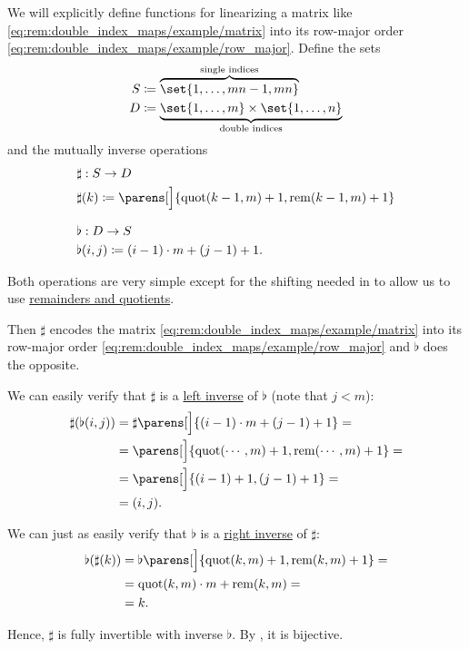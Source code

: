 \begin{remark}
  We will explicitly define functions for linearizing a matrix like \eqref{eq:rem:double_index_maps/example/matrix} into its row-major order \eqref{eq:rem:double_index_maps/example/row_major}. Define the sets
  \begin{align*}
    S &\coloneqq \overbrace{ \set{ 1, \ldots, mn - 1, mn } }^{\T{single indices}}
    \\
    D &\coloneqq \underbrace{ \set{ 1, \ldots, m } \times \set{ 1, \ldots, n } }_{\T{double indices}}
  \end{align*}
  and the mutually inverse operations
  \begin{align}
    &\begin{aligned}\label{eq:rem:double_index_maps/sharp}
      &\sharp: S \to D \\
      &\sharp(k) \coloneqq \parens[\Big]{ \quot(k - 1, m) + 1, \rem(k - 1, m) + 1 } \\
    \end{aligned}
    \\[0.5\baselineskip]
    &\begin{aligned}\label{eq:rem:double_index_maps/flat}
      &\flat: D \to S \\
      &\flat(i, j) \coloneqq (i - 1) \cdot m + (j - 1) + 1.
    \end{aligned}
  \end{align}

  Both operations are very simple except for the shifting needed in to allow us to use \hyperref[def:euclidean_domain]{remainders and quotients}.

  Then \( \sharp \) encodes the matrix \eqref{eq:rem:double_index_maps/example/matrix} into its row-major order \eqref{eq:rem:double_index_maps/example/row_major} and \( \flat \) does the opposite.

  We can easily verify that \( \sharp \) is a \hyperref[def:function_invertibility_categorical/left]{left inverse} of \( \flat \) (note that \( j < m \)):
  \begin{align*}
    \sharp(\flat(i, j))
    &=
    \sharp\parens[\Big]{ (i - 1) \cdot m + (j - 1) + 1 }
    = \\ &=
    \parens[\Big]{ \quot(\cdots, m) + 1, \rem(\cdots, m) + 1 }
    = \\ &=
    \parens[\Big]{ (i - 1) + 1, (j - 1) + 1 }
    = \\ &=
    (i, j).
  \end{align*}

  We can just as easily verify that \( \flat \) is a \hyperref[def:function_invertibility_categorical/right]{right inverse} of \( \sharp \):
  \begin{align*}
    \flat(\sharp(k))
    &=
    \flat\parens[\Big]{ \quot(k, m) + 1, \rem(k, m) + 1 }
    = \\ &=
    \quot(k, m) \cdot m + \rem(k, m)
    = \\ &=
    k.
  \end{align*}

  Hence, \( \sharp \) is fully invertible with inverse \( \flat \). By , it is bijective.
\end{remark}
